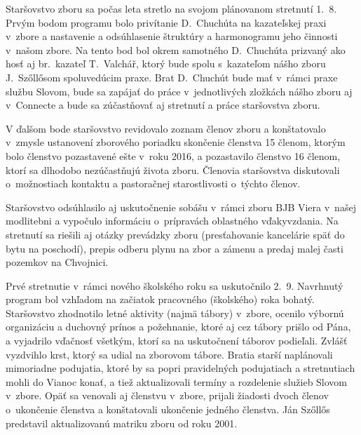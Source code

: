 \def\velkostpisma{10}
\def\velkostriadku{12.5}



Staršovstvo zboru sa počas leta stretlo na svojom plánovanom stretnutí 1.~8. Prvým bodom programu bolo privítanie D.~Chuchúta na kazateľskej praxi v~zbore a nastavenie a odsúhlasenie štruktúry a harmonogramu jeho činnosti v~našom zbore. Na tento bod bol okrem samotného D.~Chuchúta prizvaný ako hosť aj br.~kazateľ T.~Valchář, ktorý bude spolu s~kazateľom nášho zboru J.~Szőllősom spoluvedúcim praxe. Brat D.~Chuchút bude mať v~rámci praxe službu Slovom, bude sa zapájať do práce v~jednotlivých zložkách nášho zboru aj v~Connecte a bude sa zúčastňovať aj stretnutí a práce staršovstva zboru.

V ďalšom bode staršovstvo revidovalo zoznam členov zboru a konštatovalo v~zmysle ustanovení zborového poriadku skončenie členstva 15 členom, ktorým bolo členstvo pozastavené ešte v~roku 2016, a pozastavilo členstvo 16 členom, ktorí sa dlhodobo nezúčastňujú života zboru. Členovia staršovstva diskutovali o~možnostiach kontaktu a pastoračnej starostlivosti o~týchto členov.

Staršovstvo odsúhlasilo aj uskutočnenie sobášu v~rámci zboru BJB Viera v~našej modlitebni a vypočulo informáciu o~prípravách oblastného vďakyvzdania. Na stretnutí sa riešili aj otázky prevádzky zboru (presťahovanie kancelárie späť do bytu na poschodí), prepis odberu plynu na zbor a zámenu a predaj malej časti pozemkov na Chvojnici.

Prvé stretnutie v~rámci nového školského roku sa uskutočnilo 2.~9. Navrhnutý program bol vzhľadom na začiatok pracovného (školského) roka bohatý. Staršovstvo zhodnotilo letné aktivity (najmä tábory) v~zbore, ocenilo výbornú organizáciu a duchovný prínos a požehnanie, ktoré aj cez tábory prišlo od Pána, a vyjadrilo vďačnosť všetkým, ktorí sa na uskutočnení táborov podieľali. Zvlášť vyzdvihlo krst, ktorý sa udial na zborovom tábore. Bratia starší naplánovali mimoriadne podujatia, ktoré by sa popri pravidelných podujatiach a stretnutiach mohli do Vianoc konať, a tiež aktualizovali termíny a rozdelenie služieb Slovom v~zbore. Opäť sa venovali aj členstvu v~zbore, prijali žiadosti dvoch členov o~ukončenie členstva a konštatovali ukončenie jedného členstva. Ján Szőllős predstavil aktualizovanú matriku zboru od roku 2001.

